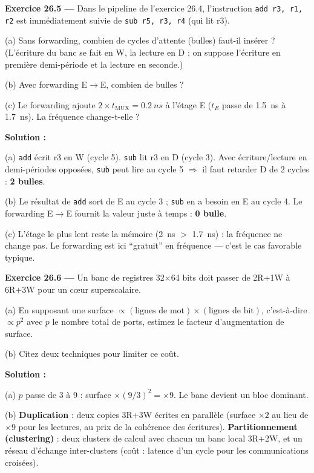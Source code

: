\documentclass[12pt,a4paper,twoside]{book}
\begin{document}
\textbf{Exercice 26.5 ---} Dans le pipeline de l'exercice 26.4, l'instruction \texttt{add r3, r1, r2} est immédiatement suivie de \texttt{sub r5, r3, r4} (qui lit r3).

(a) Sans forwarding, combien de cycles d'attente (bulles) faut-il insérer ? (L'écriture du banc se fait en W, la lecture en D ; on suppose l'écriture en première demi-période et la lecture en seconde.)

(b) Avec forwarding E$\to$E, combien de bulles ?

(c) Le forwarding ajoute $2\times t_{\text{MUX}} = \SI{0.2}{ns}$ à l'étage E ($t_E$ passe de \SI{1.5}{ns} à \SI{1.7}{ns}). La fréquence change-t-elle ?

\begin{pratique}
\textbf{Solution :}

(a) \texttt{add} écrit r3 en W (cycle 5). \texttt{sub} lit r3 en D (cycle 3). Avec écriture/lecture en demi-périodes opposées, \texttt{sub} peut lire au cycle 5 $\Rightarrow$ il faut retarder D de 2 cycles : \textbf{2 bulles}.

(b) Le résultat de \texttt{add} sort de E au cycle 3 ; \texttt{sub} en a besoin en E au cycle 4. Le forwarding E$\to$E fournit la valeur juste à temps : \textbf{0 bulle}.

(c) L'étage le plus lent reste la mémoire (\SI{2}{ns} $>$ \SI{1.7}{ns}) : la fréquence ne change pas. Le forwarding est ici ``gratuit'' en fréquence --- c'est le cas favorable typique.
\end{pratique}

\textbf{Exercice 26.6 ---} Un banc de registres 32$\times$64 bits doit passer de 2R+1W à 6R+3W pour un cœur superscalaire.

(a) En supposant une surface $\propto (\text{lignes de mot})\times(\text{lignes de bit})$, c'est-à-dire $\propto p^2$ avec $p$ le nombre total de ports, estimez le facteur d'augmentation de surface.

(b) Citez deux techniques pour limiter ce coût.

\begin{pratique}
\textbf{Solution :}

(a) $p$ passe de 3 à 9 : surface $\times (9/3)^2 = \times 9$. Le banc devient un bloc dominant.

(b) \textbf{Duplication} : deux copies 3R+3W écrites en parallèle (surface $\times 2$ au lieu de $\times 9$ pour les lectures, au prix de la cohérence des écritures). \textbf{Partitionnement (clustering)} : deux clusters de calcul avec chacun un banc local 3R+2W, et un réseau d'échange inter-clusters (coût : latence d'un cycle pour les communications croisées).
\end{pratique}
\end{document}
